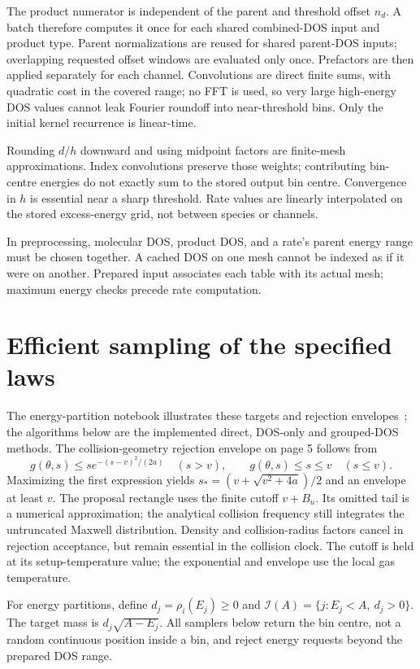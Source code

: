 \documentclass[10pt,a4paper]{article}
\begin{document}
The product numerator is independent of the parent and threshold offset
$n_d$. A batch therefore computes it once for each shared combined-DOS input
and product type. Parent normalizations are reused for shared parent-DOS
inputs; overlapping requested offset windows are evaluated only once.
Prefactors are then applied separately for each channel. Convolutions are
direct finite sums, with quadratic cost in the covered range; no FFT is used,
so very large high-energy DOS values cannot leak Fourier roundoff into
near-threshold bins. Only the initial kernel recurrence is linear-time.

Rounding $d/h$ downward and using midpoint factors are finite-mesh
approximations. Index convolutions preserve those weights; contributing
bin-centre energies do not exactly sum to the stored output bin centre.
Convergence in $h$ is essential near a sharp threshold. Rate values are
linearly interpolated on the stored excess-energy grid, not between species
or channels.

In preprocessing, molecular DOS, product DOS, and a rate's parent energy range
must be chosen together. A cached DOS on one mesh cannot be indexed as if it
were on another. Prepared input associates each table with its actual mesh;
maximum energy checks precede rate computation.

\clearpage
\section{Efficient sampling of the specified laws}\label{app:sampling}
The energy-partition notebook illustrates these targets and rejection
envelopes~\cite{vibnotebook}; the algorithms below are the implemented direct,
DOS-only and grouped-DOS methods.
The collision-geometry rejection envelope on page 5 follows from
\[
 g(\theta,s)\leq s e^{-(s-v)^2/(2a)}\quad(s>v),
 \qquad g(\theta,s)\leq s\leq v\quad(s\leq v).
\]
Maximizing the first expression yields
$s_*=(v+\sqrt{v^2+4a})/2$ and an envelope at least $v$.
The proposal rectangle uses the finite cutoff $v+B_u$. Its omitted tail is a
numerical approximation; the analytical collision frequency still integrates
the untruncated Maxwell distribution. Density and collision-radius factors
cancel in rejection acceptance, but remain essential in the collision clock.
The cutoff is held at its setup-temperature value; the exponential and
envelope use the local gas temperature.

For energy partitions, define $d_j=\rho_i(E_j)\geq0$ and
$\mathcal I(A)=\{j:E_j<A,\ d_j>0\}$. The target mass is
$d_j\sqrt{A-E_j}$. All samplers below return the bin centre, not a random
continuous position inside a bin, and reject energy requests beyond the
prepared DOS range.
\end{document}
